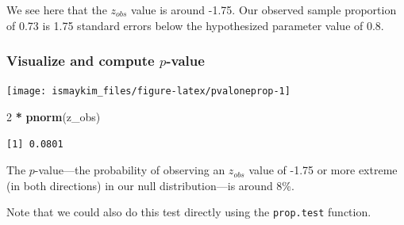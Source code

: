 \documentclass[12pt,]{krantz}
\makeatletter
\newenvironment{Shaded}{\begin{snugshade}}{\end{snugshade}}
\newcommand{\KeywordTok}[1]{\textcolor[rgb]{0.27,0.27,0.27}{\textbf{#1}}}
\newcommand{\DataTypeTok}[1]{\textcolor[rgb]{0.27,0.27,0.27}{#1}}
\newcommand{\DecValTok}[1]{\textcolor[rgb]{0.06,0.06,0.06}{#1}}
\newcommand{\FloatTok}[1]{\textcolor[rgb]{0.06,0.06,0.06}{#1}}
\newcommand{\StringTok}[1]{\textcolor[rgb]{0.5,0.5,0.5}{#1}}
\newcommand{\OperatorTok}[1]{\textcolor[rgb]{0.43,0.43,0.43}{\textbf{#1}}}
\newcommand{\NormalTok}[1]{#1}
\newenvironment{kframe}{%
\medskip{}
\setlength{\fboxsep}{.8em}
 \def\at@end@of@kframe{}%
 \ifinner\ifhmode%
  \def\at@end@of@kframe{\end{minipage}}%
  \begin{minipage}{\columnwidth}%
 \fi\fi%
 \def\FrameCommand##1{\hskip\@totalleftmargin \hskip-\fboxsep
 \colorbox{shadecolor}{##1}\hskip-\fboxsep
     \hskip-\linewidth \hskip-\@totalleftmargin \hskip\columnwidth}%
 \MakeFramed {\advance\hsize-\width
   \@totalleftmargin\z@ \linewidth\hsize
   \@setminipage}}%
 {\par\unskip\endMakeFramed%
 \at@end@of@kframe}
\renewenvironment{Shaded}{\begin{kframe}}{\end{kframe}}
\makeatother
\begin{document}
We see here that the \(z_{obs}\) value is around -1.75. Our observed
sample proportion of 0.73 is 1.75 standard errors below the hypothesized
parameter value of 0.8.

\subsubsection*{\texorpdfstring{Visualize and compute
\(p\)-value}{Visualize and compute p-value}}\label{visualize-and-compute-p-value}


\begin{Shaded}
\end{Shaded}

\begin{center}\texttt{[image: ismaykim\_files/figure-latex/pvaloneprop-1]} \end{center}

\begin{Shaded}
\begin{Highlighting}[]
\DecValTok{2} \OperatorTok{*}\StringTok{ }\KeywordTok{pnorm}\NormalTok{(z_obs)}
\end{Highlighting}
\end{Shaded}

\begin{verbatim}
[1] 0.0801
\end{verbatim}

The \(p\)-value---the probability of observing an \(z_{obs}\) value of
-1.75 or more extreme (in both directions) in our null distribution---is
around 8\%.

Note that we could also do this test directly using the
\texttt{prop.test} function.
\end{document}
